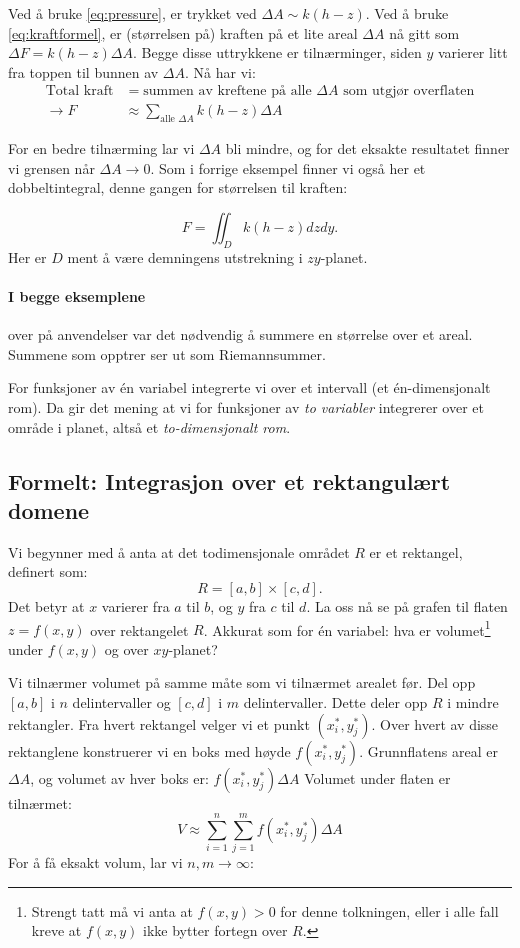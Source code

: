 Ved å bruke \eqref{eq:pressure}, er trykket ved \( \Delta A \sim k(h - z) \). Ved å bruke \eqref{eq:kraftformel}, er (størrelsen på) kraften på et lite areal \( \Delta A\) nå gitt som \( \Delta F= k(h - z)\Delta A \). Begge disse uttrykkene er tilnærminger, siden \( y \) varierer litt fra toppen til bunnen av \( \Delta A \). Nå har vi:
\begin{align*}
\text{Total kraft} &= \text{summen av kreftene på alle } \Delta A \text{ som utgjør overflaten} \\
\rightarrow F &\approx \sum_{\text{alle } \Delta A} k(h - z)\Delta A
\end{align*}

For en bedre tilnærming lar vi \( \Delta A \) bli mindre, og for det eksakte resultatet finner vi grensen når \( \Delta A \to 0 \). Som i forrige eksempel finner vi også her et dobbeltintegral, denne gangen for størrelsen til kraften:

\[F=\iint_Dk(h-z)dzdy.\]
Her er $D$ ment å være demningens utstrekning i $zy$-planet.

\paragraph{I begge eksemplene} over på anvendelser var det nødvendig å summere en størrelse over et areal. Summene som opptrer ser ut som Riemannsummer. 


For funksjoner av én variabel integrerte vi over et intervall (et én-dimensjonalt rom). Da gir det mening at vi for funksjoner av \textit{to variabler} integrerer over et område i planet, altså et \textit{to-dimensjonalt rom}.


\subsection*{Formelt: Integrasjon over et rektangulært domene}
Vi begynner med å anta at det todimensjonale området \( R \) er et rektangel, definert som:
\[
R = [a, b] \times [c, d].
\]
Det betyr at \( x \) varierer fra \( a \) til \( b \), og \( y \) fra \( c \) til \( d \).
La oss nå se på grafen til flaten \( z = f(x, y) \) over rektangelet \( R \). Akkurat som for én variabel: hva er volumet\footnote{Strengt tatt må vi anta at $f(x,y)>0$ for denne tolkningen, eller i alle fall kreve at $f(x,y)$ ikke bytter fortegn over $R$.} under \( f(x, y) \) og over \( xy \)-planet?

Vi tilnærmer volumet på samme måte som vi tilnærmet arealet før. Del opp \( [a, b] \) i \( n \) delintervaller og \( [c, d] \) i \( m \) delintervaller. Dette deler opp \( R \) i mindre rektangler. Fra hvert rektangel velger vi et punkt \( (x_i^*, y_j^*) \). Over hvert av disse rektanglene konstruerer vi en boks med høyde \( f(x_i^*, y_j^*) \). Grunnflatens areal er \( \Delta A \), og volumet av hver boks er:
\(
f(x_i^*, y_j^*) \Delta A
\)
Volumet under flaten er tilnærmet:
\[
V \approx \sum_{i=1}^n \sum_{j=1}^m f(x_i^*, y_j^*) \Delta A
\]
For å få eksakt volum, lar vi \( n, m \to \infty \):

